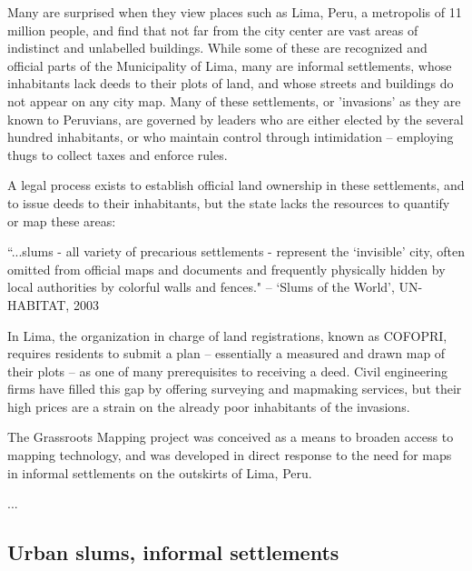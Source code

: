 \documentclass[11pt]{report}
\begin{document}
Many are surprised when they view places such as Lima, Peru, a metropolis of 11 million people, and find that not far from the city center are vast areas of indistinct and unlabelled buildings. While some of these are recognized and official parts of the Municipality of Lima, many are informal settlements, whose inhabitants lack deeds to their plots of land, and whose streets and buildings do not appear on any city map. Many of these settlements, or 'invasions' as they are known to Peruvians, are governed by leaders who are either elected by the several hundred inhabitants, or who maintain control through intimidation -- employing thugs to collect taxes and enforce rules. 

A legal process exists to establish official land ownership in these settlements, and to issue deeds to their inhabitants, but the state lacks the resources to quantify or map these areas:

``...slums - all variety of precarious settlements - represent the `invisible' city, often omitted from official maps and documents and frequently physically hidden by local authorities by colorful walls and fences." -- `Slums of the World', UN-HABITAT, 2003


In Lima, the organization in charge of land registrations, known as COFOPRI, requires residents to submit a plan -- essentially a measured and drawn map of their plots -- as one of many prerequisites to receiving a deed. Civil engineering firms have filled this gap by offering surveying and mapmaking services, but their high prices are a strain on the already poor inhabitants of the invasions.  


The Grassroots Mapping project was conceived as a means to broaden access to mapping technology, and was developed in direct response to the need for maps in informal settlements on the outskirts of Lima, Peru.

...

\subsection{Urban slums, informal settlements}
\end{document}
